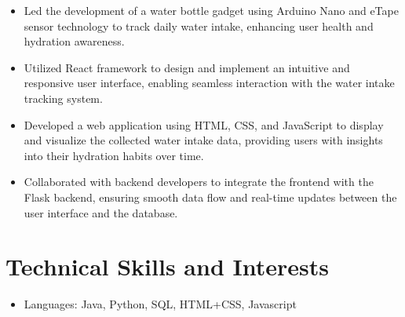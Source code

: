\documentclass[letterpaper,11pt]{article}
\begin{document}
\begin{itemize}[leftmargin=20pt, rightmargin=0cm]
    \item Led the development of a water bottle gadget using Arduino Nano and eTape sensor technology to track daily water intake, enhancing user health and hydration awareness.
    \item Utilized React framework to design and implement an intuitive and responsive user interface, enabling seamless interaction with the water intake tracking system.
    \item Developed a web application using HTML, CSS, and JavaScript to display and visualize the collected water intake data, providing users with insights into their hydration habits over time.
    \item Collaborated with backend developers to integrate the frontend with the Flask backend, ensuring smooth data flow and real-time updates between the user interface and the database.
\end{itemize}

\section*{Technical Skills and Interests}
\begin{itemize}[leftmargin=20pt, rightmargin=0cm]
    \item Languages: Java, Python, SQL, HTML+CSS, Javascript 
\end{itemize}
\end{document}
